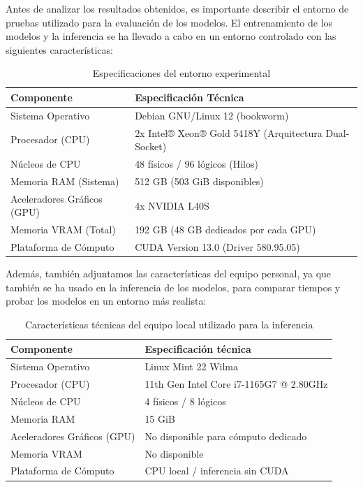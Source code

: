 Antes de analizar los resultados obtenidos, es importante describir el entorno de pruebas utilizado para la evaluación de los modelos. El entrenamiento de los modelos y la inferencia se ha llevado a cabo en un entorno controlado con las siguientes características:

\begin{table}[H]
    \centering
    \begin{tabular}{|l|l|}
        \hline
        \textbf{Componente} & \textbf{Especificación Técnica} \\
        \hline
        Sistema Operativo & Debian GNU/Linux 12 (bookworm) \\
        \hline
        Procesador (CPU) & 2x Intel® Xeon® Gold 5418Y (Arquitectura Dual-Socket) \\
        \hline
        Núcleos de CPU & 48 físicos / 96 lógicos (Hilos) \\
        \hline
        Memoria RAM (Sistema) & 512 GB (503 GiB disponibles) \\
        \hline
        Aceleradores Gráficos (GPU) & 4x NVIDIA L40S \\
        \hline
        Memoria VRAM (Total) & 192 GB (48 GB dedicados por cada GPU) \\
        \hline
        Plataforma de Cómputo & CUDA Version 13.0 (Driver 580.95.05) \\
        \hline
    \end{tabular}
    \caption{Especificaciones del entorno experimental}
    \label{tab:entorno_experimental}
\end{table}

Además, también adjuntamos las características del equipo personal, ya que también se ha usado en la inferencia de los modelos, para comparar tiempos y probar los modelos en un entorno más realista:

\begin{table}[H]
    \centering
    \begin{tabular}{|l|l|}
        \hline
        \textbf{Componente} & \textbf{Especificación técnica} \\
        \hline
        Sistema Operativo & Linux Mint 22 Wilma \\
        \hline
        Procesador (CPU) & 11th Gen Intel\textregistered{} Core\texttrademark{} i7-1165G7 @ 2.80GHz \\
        \hline
        Núcleos de CPU & 4 físicos / 8 lógicos \\
        \hline
        Memoria RAM & 15 GiB \\
        \hline
        Aceleradores Gráficos (GPU) & No disponible para cómputo dedicado \\
        \hline
        Memoria VRAM & No disponible \\
        \hline
        Plataforma de Cómputo & CPU local / inferencia sin CUDA \\
        \hline
    \end{tabular}
    \caption{Características técnicas del equipo local utilizado para la inferencia}
    \label{tab:equipo_local}
\end{table}


